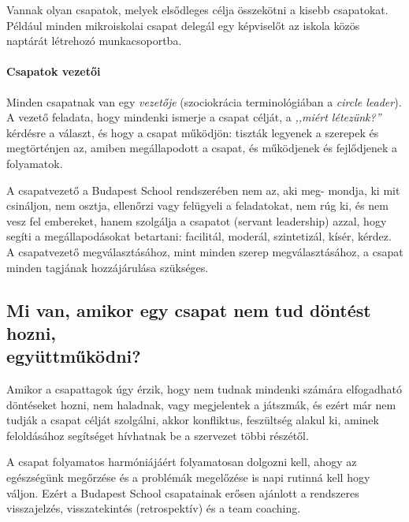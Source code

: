 Vannak olyan csapatok, melyek elsődleges célja összekötni a kisebb csapatokat. Például minden mikroiskolai csapat delegál egy képviselőt az iskola közös naptárát létrehozó munka\-csoportba.

\paragraph{Csapatok vezetői}

Minden csapatnak van egy \emph{vezetője} (szociokrácia terminológiában a
\emph{circle leader}). A vezető feladata, hogy mindenki ismerje a csapat célját, a \emph{,,miért létezünk?''} kérdésre a választ, és hogy a csapat működjön: tiszták legyenek a szerepek és megtörténjen az, amiben megállapodott a csapat, és működjenek és fejlődjenek a folyamatok.

A csapatvezető a Budapest School rendszerében nem az, aki
meg-\linebreak
mondja, ki mit csináljon, nem osztja, ellenőrzi vagy felügyeli a feladatokat, nem rúg ki, és nem vesz fel embereket, hanem szolgálja a csapatot (servant leadership) azzal, hogy segíti a megállapodásokat betartani: facilitál, moderál, szintetizál, kísér, kérdez. A csapatvezető megválasztásához, mint minden szerep megválasztásához, a csapat minden tagjának hozzájárulása szükséges.




\subsection{Mi van, amikor egy csapat nem tud döntést hozni,\\ együttműködni?}

Amikor a csapattagok úgy érzik, hogy nem tudnak mindenki számára elfogadható döntéseket hozni, nem haladnak, vagy megjelentek a játszmák, és ezért már nem tudják a csapat célját szolgálni, akkor konfliktus, feszültség alakul ki, aminek feloldásához segítséget hívhatnak be a szervezet többi részétől. %

A csapat folyamatos harmóniájáért folyamatosan dolgozni kell, ahogy az egészségünk megőrzése és a problémák megelőzése is napi rutinná kell hogy váljon. Ezért a Budapest School csapatainak erősen ajánlott a rendszeres visszajelzés, visszatekintés (retrospektív) és a team coaching.
